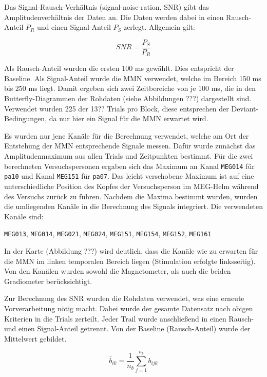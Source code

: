 \documentclass[doc,a4paper,12pt]{apa6}
\begin{document}
Das Signal-Rausch-Verhältnis (signal-noise-ration, SNR) gibt das Amplitudenverhältnis der Daten an. Die Daten werden dabei in einen Rausch-Anteil $P_R$ und einen Signal-Anteil $P_S$ zerlegt. Allgemein gilt:

\begin{equation}
SNR = \frac{P_S}{P_R}
\end{equation}

Als Rausch-Anteil wurden die ersten 100 ms gewählt. Dies entspricht der Baseline. Als Signal-Anteil wurde die MMN verwendet, welche im Bereich 150 ms bis 250 ms liegt. Damit ergeben sich zwei Zeitbereiche von je 100 ms, die in den Butterfly-Diagrammen der Rohdaten (siehe Abbildungen ???) dargestellt sind. Verwendet wurden 225 der 13?? Trials pro Block, diese entsprechen der Deviant-Bedingungen, da nur hier ein Signal für die MMN erwartet wird.

Es wurden nur jene Kanäle für die Berechnung verwendet, welche am Ort der Entstehung der MMN entsprechende Signale messen. Dafür wurde zunächst das Amplitudenmaximum aus allen Trials und Zeitpunkten bestimmt. Für die zwei berechneten Versuchspersonen ergaben sich das Maximum an Kanal \texttt{MEG014} für \texttt{pa10} und Kanal \texttt{MEG151} für \texttt{pa07}. Das leicht verschobene Maximum ist auf eine unterschiedliche Position des Kopfes der Versuchsperson im MEG-Helm während des Versuchs zurück zu führen. Nachdem die Maxima bestimmt wurden, wurden die umliegenden Kanäle in die Berechnung des Signals integriert. Die verwendeten Kanäle sind:

\texttt{MEG013}, \texttt{MEG014}, \texttt{MEG021}, \texttt{MEG024}, \texttt{MEG151}, \texttt{MEG154}, \texttt{MEG152}, \texttt{MEG161}

In der Karte (Abbildung ???) wird deutlich, dass die Kanäle wie zu erwarten für die MMN im linken temporalen Bereich liegen (Stimulation erfolgte linksseitig). Von den Kanälen wurden sowohl die Magnetometer, als auch die beiden Gradiometer berücksichtigt.

Zur Berechnung des SNR wurden die Rohdaten verwendet, was eine erneute Vorverarbeitung nötig macht. Dabei wurde der gesamte Datensatz nach obigen Kriterien in die Trials zerteilt. Jeder Trail wurde anschließend in einen Rausch- und einen Signal-Anteil getrennt. Von der Baseline (Rausch-Anteil) wurde der Mittelwert gebildet.

\begin{equation}
\bar{b}_{ik} = \frac{1}{n_b} \sum_{j=1}^{n_b} b_{ijk}
\end{equation}
\end{document}

